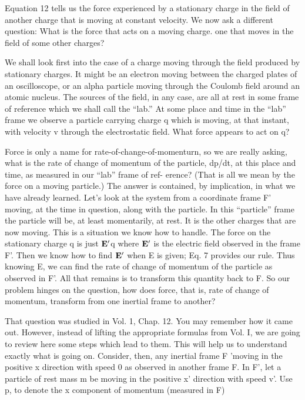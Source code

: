 Equation 12 tells us the force experienced by a stationary charge
in the field of another charge that is moving at constant velocity.
We now ask a different question: What is the force that acts on a
moving charge. one that moves in the field of some other charges?

We shall look first into the case of a charge moving through the field
produced by stationary charges. It might be an electron moving
between the charged plates of an oscilloscope, or an alpha particle
moving through the Coulomb field around an atomic nucleus. The
sources of the field, in any case, are all at rest in some frame of reference
which we shall call the ``lab.'' At some place and time in the
``lab'' frame we observe a particle carrying charge q which is moving,
at that instant, with velocity v through the electrostatic field. What
force appears to act on q?

Force is only a name for rate-of-change-of-momenturn, so we are
really asking, what is the rate of change of momentum of the particle,
dp/dt, at this place and time, as measured in our ``lab'' frame of ref-
erence? (That is all we mean by the force on a moving particle.)
The answer is contained, by implication, in what we have already
learned. Let's look at the system from a coordinate frame F' moving,
at the time in question, along with the particle. In this ``particle''
frame the particle will be, at least momentarily, at rest. It is the
other charges that are now moving. This is a situation we know
how to handle. The force on the stationary charge q is just $\mathbf{E}'$q where
$\mathbf{E}'$ is the electric field observed in the frame F'. Then we know how
to find $\mathbf{E}'$ when E is given; Eq. 7 provides our rule. Thus knowing
E, we can find the rate of change of momentum of the particle as
observed in F'. All that remains is to transform this quantity back
to F. So our problem hinges on the question, how does force, that
is, rate of change of momentum, transform from one inertial frame
to another?

That question was studied in Vol. 1, Chap. 12. You may remember
how it came out. However, instead of lifting the appropriate formulas
from Vol. I, we are going to review here some steps which lead
to them. This will help us to understand exactly what is going on.
Consider, then, any inertial frame F 'moving in the positive x direction
with speed 0 as observed in another frame F. In F', let a particle
of rest mass m be moving in the positive x' direction with speed v'.
Use p, to denote the x component of momentum (measured in F)

